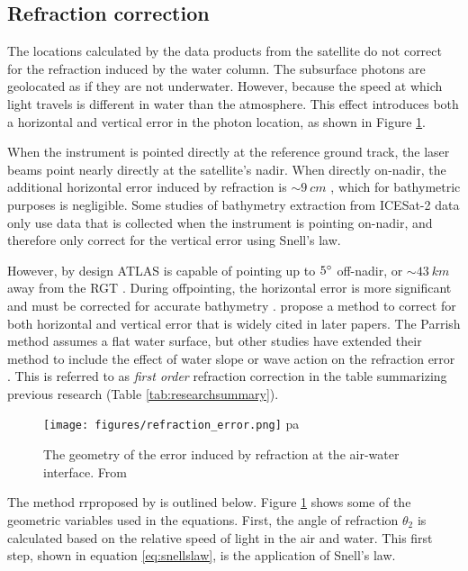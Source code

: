 \subsection{Refraction correction}

The locations calculated by the data products from the satellite do not correct for the refraction induced by the water column. The subsurface photons are geolocated as if they are not underwater. However, because the speed at which light travels is different in water than the atmosphere. This effect introduces both a horizontal and vertical error in the photon location, as shown in Figure \ref{refract-image}.

When the instrument is pointed directly at the reference ground track, the laser beams point nearly directly at the satellite's nadir. When directly on-nadir, the additional horizontal error induced by refraction is $\sim 9~cm$ \parencite{Parrish2019}, which for bathymetric purposes is negligible. Some studies of bathymetry extraction from ICESat-2 data only use data that is collected when the instrument is pointing on-nadir, and therefore only correct for the vertical error using Snell's law.

However, by design ATLAS is capable of pointing up to $5 \degree$ off-nadir, or $\sim43~km$ away from the RGT \parencite{Magruder2021}. During offpointing, the horizontal error is more significant and must be corrected for accurate bathymetry \parencite{Parrish2019}. \citeauthor{Parrish2019} propose a method to correct for both horizontal and vertical error that is widely cited in later papers. The Parrish method assumes a flat water surface, but other studies have extended their method to include the effect of water slope or wave action on the refraction error \parencite{Ma2020,Zhang2022}.  This is referred to as \emph{first order} refraction correction in the table summarizing previous research (Table \ref{tab:researchsummary}).


\begin{figure}[!ht]
      \centering
      \texttt{[image: figures/refraction\_error.png]}
pa      \caption[Effects of refraction on lidar beam]{The geometry of the error induced by refraction at the air-water interface. From \cite{Parrish2019}}
      \label{refract-image}
\end{figure}

The method rrproposed by \citeauthor{Parrish2019} is outlined below. Figure \ref{refract-image} shows some of the geometric variables used in the equations. First, the angle of refraction $\theta_2$ is calculated based on the relative speed of light in the air and water. This first step, shown in equation \ref{eq:snellslaw}, is the application of Snell's law.

